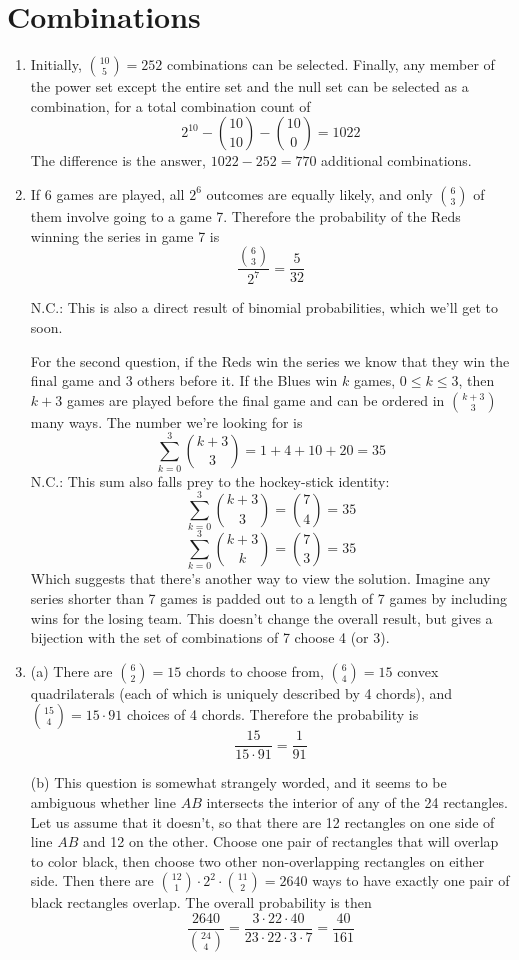 \documentclass{book}
\numberwithin{equation}{section}
\begin{document}
\chapter{Combinations}

\begin{enumerate}[label={2.\arabic*}]

\item
Initially, ${10 \choose 5} = 252$ combinations can be selected. Finally,
any member of the power set except the entire set and the null set can be
selected as a combination, for a total combination count of
$$2^{10} - {10 \choose 10} - {10 \choose 0} = 1022$$
The difference is the answer, $1022 - 252 = 770$ additional combinations.

\item
If 6 games are played, all $2^6$ outcomes are equally likely, and only
${6 \choose 3}$ of them involve going to a game 7. Therefore the probability
of the Reds winning the series in game 7 is
$$\frac{{6 \choose 3}}{2^7} = \frac{5}{32}$$

N.C.: This is also a direct result of binomial probabilities, which we'll
get to soon.

For the second question, if the Reds win the series we know that they win
the final game and 3 others before it. If the Blues win $k$ games,
$0 \leq k \leq 3$, then $k+3$ games are played before the final game and
can be ordered in ${k+3 \choose 3}$ many ways. The number we're looking for is
$$\sum_{k=0}^{3} {k+3 \choose 3} = 1 + 4 + 10 + 20 = 35$$
N.C.: This sum also falls prey to the hockey-stick identity:
$$\sum_{k=0}^{3} {k+3 \choose 3} = {7 \choose 4} = 35$$
$$\sum_{k=0}^{3} {k+3 \choose k} = {7 \choose 3} = 35$$
Which suggests that there's another way to view the solution. Imagine any
series shorter than 7 games is padded out to a length of 7 games by including
wins for the losing team. This doesn't change the overall result, but gives
a bijection with the set of combinations of 7 choose 4 (or 3).

\item
(a) There are ${6 \choose 2} = 15$ chords to choose from, ${6 \choose 4} = 15$
convex quadrilaterals (each of which is uniquely described by 4 chords), and
${15 \choose 4} = 15 \cdot 91$ choices of 4 chords. Therefore the probability is
$$\frac{15}{15 \cdot 91} = \frac{1}{91}$$

(b) This question is somewhat strangely worded, and it seems to be ambiguous
whether line $AB$ intersects the interior of any of the 24 rectangles. Let us
assume that it doesn't, so that there are 12 rectangles on one side of line
$AB$ and 12 on the other. Choose one pair of rectangles that will overlap to
color black, then choose two other non-overlapping rectangles on either side.
Then there are
${12 \choose 1} \cdot 2^2 \cdot {11 \choose 2} = 2640$ ways to have exactly
one pair of black rectangles overlap. The overall probability is then
$$\frac{2640}{{24 \choose 4}} = \frac{3 \cdot 22 \cdot 40}{23 \cdot 22 \cdot 3 \cdot 7} = \frac{40}{161}$$


\end{enumerate}
\end{document}
